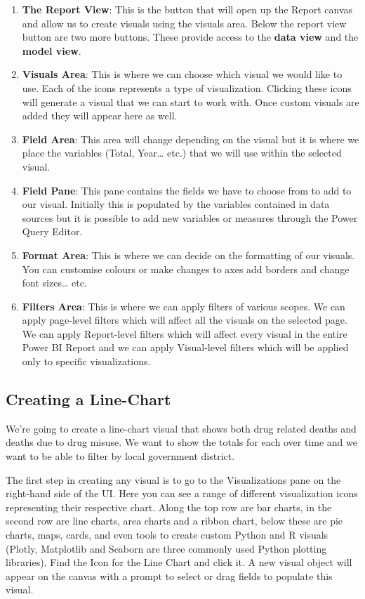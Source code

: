 \documentclass[
]{book}
\begin{document}
\begin{enumerate}
\def\labelenumi{\arabic{enumi}.}
\item
  \textbf{The Report View}: This is the button that will open up the Report canvas and allow us to create visuals using the visuals area. Below the report view button are two more buttons. These provide access to the \textbf{data view} and the \textbf{model view}.
\item
  \textbf{Visuals Area}: This is where we can choose which visual we would like to use. Each of the icons represents a type of visualization. Clicking these icons will generate a visual that we can start to work with. Once custom visuals are added they will appear here as well.
\item
  \textbf{Field Area}: This area will change depending on the visual but it is where we place the variables (Total, Year\ldots{} etc.) that we will use within the selected visual.
\item
  \textbf{Field Pane}: This pane contains the fields we have to choose from to add to our visual. Initially this is populated by the variables contained in data sources but it is possible to add new variables or measures through the Power Query Editor.
\item
  \textbf{Format Area}: This is where we can decide on the formatting of our visuals. You can customise colours or make changes to axes add borders and change font sizes\ldots{} etc.
\item
  \textbf{Filters Area}: This is where we can apply filters of various scopes. We can apply page-level filters which will affect all the visuals on the selected page. We can apply Report-level filters which will affect every visual in the entire Power BI Report and we can apply Visual-level filters which will be applied only to specific visualizations.
\end{enumerate}

\hypertarget{creating-a-line-chart}{%
\subsection{Creating a Line-Chart}\label{creating-a-line-chart}}

We're going to create a line-chart visual that shows both drug related deaths and deaths due to drug misuse. We want to show the totals for each over time and we want to be able to filter by local government district.

The first step in creating any visual is to go to the Visualizations pane on the right-hand side of the UI. Here you can see a range of different visualization icons representing their respective chart. Along the top row are bar charts, in the second row are line charts, area charts and a ribbon chart, below these are pie charts, maps, cards, and even tools to create custom Python and R visuals (Plotly, Matplotlib and Seaborn are three commonly used Python plotting libraries). Find the Icon for the Line Chart and click it. A new visual object will appear on the canvas with a prompt to select or drag fields to populate this visual.
\end{document}
